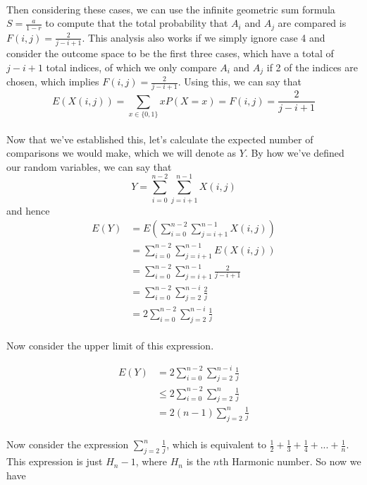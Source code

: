 \documentclass{article}
\begin{document}
\paragraph{} Then considering these cases, we can use the infinite geometric sum formula $S = \frac{a}{1-r}$ to compute that the total probability that $A_i$ and $A_j$ are compared is $F(i, j) = \frac{2}{j - i + 1}$. This analysis also works if we simply ignore case 4 and consider the outcome space to be the first three cases, which have a total of $j - i + 1$ total indices, of which we only compare $A_i$ and $A_j$ if 2 of the indices are chosen, which implies $F(i, j) = \frac{2}{j - i + 1}$. Using this, we can say that $$E(X(i, j)) = \sum_{x \in \{0, 1\}} xP(X = x) = F(i, j) = \frac{2}{j - i + 1}$$

\paragraph{} Now that we've established this, let's calculate the expected number of comparisons we would make, which we will denote as $Y$. By how we've defined our random variables, we can say that $$Y = \sum_{i = 0}^{n - 2} \sum_{j = i + 1}^{n - 1} X(i, j)$$ and hence
\begin{align*}
E(Y) &= E\left(\sum_{i = 0}^{n - 2} \sum_{j = i + 1}^{n - 1} X(i, j)\right) \\
&= \sum_{i = 0}^{n - 2} \sum_{j = i + 1}^{n - 1} E(X(i, j)) \\
&= \sum_{i = 0}^{n - 2} \sum_{j = i + 1}^{n - 1} \frac{2}{j - i + 1} \\
&= \sum_{i = 0}^{n - 2} \sum_{j = 2}^{n - i} \frac{2}{j} \\
&= 2 \sum_{i = 0}^{n - 2} \sum_{j = 2}^{n - i} \frac{1}{j}
\end{align*}

\paragraph{} Now consider the upper limit of this expression.

\begin{align*}
E(Y) &= 2 \sum_{i = 0}^{n - 2} \sum_{j = 2}^{n - i} \frac{1}{j} \\
&\leq 2 \sum_{i = 0}^{n - 2} \sum_{j = 2}^{n} \frac{1}{j} \\
&= 2 (n - 1) \sum_{j = 2}^{n}  \frac{1}{j}
\end{align*}

\paragraph{} Now consider the expression $\sum\limits_{j = 2}^{n}  \frac{1}{j}$, which is equivalent to $\frac{1}{2} + \frac{1}{3} + \frac{1}{4} + ... + \frac{1}{n}$. This expression is just $H_n - 1$, where $H_n$ is the $n$th Harmonic number. So now we have
\end{document}
